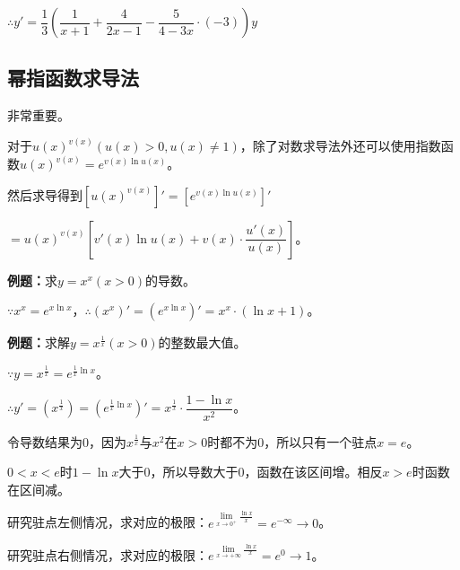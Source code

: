 \documentclass[UTF8, 12pt]{ctexart}
\begin{document}
$\therefore y'=\dfrac{1}{3}\left(\dfrac{1}{x+1}+\dfrac{4}{2x-1}-\dfrac{5}{4-3x}\cdot(-3)\right)y$

\subsection{幂指函数求导法}

非常重要。

对于$u(x)^{v(x)}(u(x)>0,u(x)\neq 1)$，除了对数求导法外还可以使用指数函数$u(x)^{v(x)}=e^{v(x)\ln u(x)}$。

然后求导得到$[u(x)^{v(x)}]'=[e^{v(x)\ln u(x)}]'$

$=u(x)^{v(x)}\left[v'(x)\ln u(x)+v(x)\cdot\dfrac{u'(x)}{u(x)}\right]$。

\textbf{例题：}求$y=x^x(x>0)$的导数。

$\because x^x=e^{x\ln x}$，$\therefore (x^x)'=(e^{x\ln x})'=x^x\cdot(\ln x+1)$。

\textbf{例题：}求解$y=x^{\frac{1}{x}}(x>0)$的整数最大值。

$\because y=x^{\frac{1}{x}}=e^{\frac{1}{x}\ln x}$。

$\therefore y'=\left(x^{\frac{1}{x}}\right)=\left(e^{\frac{1}{x}\ln x}\right)'=x^{\frac{1}{x}}\cdot\dfrac{1-\ln x}{x^2}$。

令导数结果为0，因为$x^{\frac{1}{x}}$与$x^2$在$x>0$时都不为0，所以只有一个驻点$x=e$。

$0<x<e$时$1-\ln x$大于0，所以导数大于0，函数在该区间增。相反$x>e$时函数在区间减。

研究驻点左侧情况，求对应的极限：$e^{\lim\limits_{x\to 0^+}\frac{\ln x}{x}}=e^{-\infty}\to 0$。

研究驻点右侧情况，求对应的极限：$e^{\lim\limits_{x\to+\infty}\frac{\ln x}{x}}=e^0\to 1$。

\end{document}
